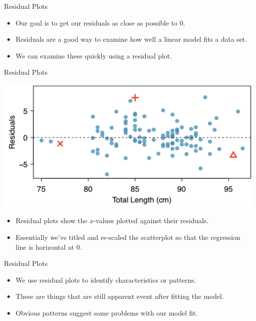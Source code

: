 \begin{frame}{Residual Plots}
    \begin{itemize}
        \item Our goal is to get our residuals as close as possible to 0.
        \item Residuals are a good way to examine how well a linear model fits a data set.
        \item We can examine these quickly using a residual plot.
    \end{itemize}
\end{frame}

\begin{frame}{Residual Plots}
    \begin{center}
        \includegraphics[scale=0.4]{images/resid.png}
    \end{center}
    \begin{itemize}
        \item Residual plots show the $x$-values plotted against their residuals.
        \item Essentially we've titled and re-scaled the scatterplot so that the regression line is horizontal at 0.
    \end{itemize}
\end{frame}

\begin{frame}{Residual Plots}
    \begin{itemize}
        \item We use residual plots to identify characteristics or patterns.
        \item These are things that are still apparent event after fitting the model.
        \item Obvious patterns suggest some problems with our model fit.
    \end{itemize}
\end{frame}

